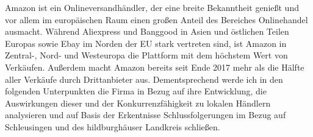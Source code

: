  Amazon ist ein Onlineversandhändler, der eine breite Bekanntheit genießt und vor allem im europäischen Raum einen großen Anteil des Bereiches Onlinehandel ausmacht. 
 Während Aliexpress und Banggood in Asien und östlichen Teilen Europas sowie Ebay im Norden der EU stark vertreten sind, ist Amazon in Zentral-, Nord- und Westeuropa die Plattform mit dem höchstem Wert von Verkäufen\cite[S. 22]{EuroCommerce}. Außerdem macht Amazon bereits seit Ende 2017 mehr als die Hälfte aller Verkäufe durch Drittanbieter aus\cite[S. 25]{Haendlerbund}. Dementsprechend werde ich in den folgenden Unterpunkten die Firma in Bezug auf ihre Entwicklung, die Auswirkungen dieser und der Konkurrenzfähigkeit zu lokalen Händlern analysieren und auf Basis der Erkentnisse Schlussfolgerungen im Bezug auf Schleusingen und des hildburghäuser Landkreis schließen.
